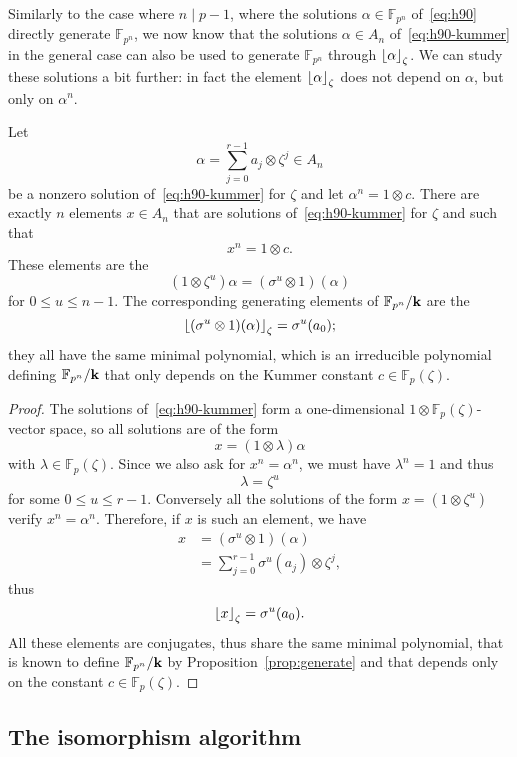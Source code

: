 Similarly to the case where $n\mid p-1$, where the solutions
$\alpha\in\mathbb{F}_{p^n}$ of~\eqref{eq:h90} directly generate $\mathbb{F}_{p^n}$, we now know
that the solutions $\alpha\in A_n$ of~\eqref{eq:h90-kummer} in the general case
can also be used to generate $\mathbb{F}_{p^n}$ through $\left\lfloor \alpha \right\rfloor_{\zeta}$.
We can study these solutions a bit further: in fact the element
$\left\lfloor \alpha \right\rfloor_{\zeta}$ does not depend on $\alpha$, but only on $\alpha^n$.
\begin{prop}
  \label{prop:kummer-constant}
  Let
  \[
    \alpha=\sum_{j=0}^{r-1}a_j\otimes\zeta^j\in A_n
  \]
  be a nonzero solution of~\eqref{eq:h90-kummer} for $\zeta$ and
  let $\alpha^n = 1\otimes c$. There are exactly $n$ elements $x\in A_n$ that
  are solutions of~\eqref{eq:h90-kummer} for $\zeta$ and such that
  \[
    x^n = 1\otimes c.
  \]
  These elements are the
  \[
    (1\otimes\zeta^u)\alpha = (\sigma^u\otimes1)(\alpha)
  \]
  for $0\leq u\leq n-1$. The corresponding generating elements of
  $\mathbb{F}_{p^n}/\mathbf{k}$ are the
  \[
    \left\lfloor (\sigma^u\otimes1)(\alpha) \right\rfloor_{\zeta} = \sigma^u(a_0);
  \]
  they all have the same minimal polynomial, which is an irreducible polynomial
  defining $\mathbb{F}_{p^n}/\mathbf{k}$ that only depends on the Kummer constant
  $c\in\mathbb{F}_{p}(\zeta)$.
\end{prop}
\begin{proof}
  The solutions of~\eqref{eq:h90-kummer} form a one-dimensional
  $1\otimes\mathbb{F}_p(\zeta)$-vector space, so all solutions are of the form
  \[
    x = (1\otimes\lambda)\alpha
  \]
  with $\lambda\in\mathbb{F}_p(\zeta)$.
  Since we also ask for $x^n = \alpha^n$, we must have $\lambda^n = 1$ and thus 
  \[
    \lambda = \zeta^u
  \]
  for some $0\leq u\leq r-1$. Conversely all the solutions of the form
  $x=(1\otimes\zeta^u)$ verify $x^n=\alpha^n$. Therefore, if $x$ is such an
  element, we have
  \begin{align*}
    x &= (\sigma^u\otimes1)(\alpha)\\
    &= \sum_{j=0}^{r-1}\sigma^u(a_j)\otimes\zeta^j,
  \end{align*}
  thus
  \[
    \left\lfloor x \right\rfloor_{\zeta} = \sigma^u(a_0).
  \]
  All these elements are conjugates, thus share the same minimal polynomial,
  that is known to define $\mathbb{F}_{p^n}/\mathbf{k}$ by
  Proposition~\ref{prop:generate} and that depends only on the constant
  $c\in\mathbb{F}_p(\zeta)$.
\end{proof}

\subsection{The isomorphism algorithm}
\label{sec:lenstra-allombert-isomorphism}

